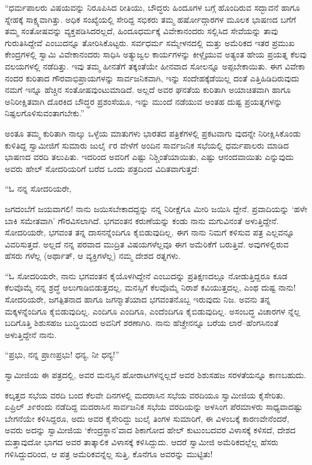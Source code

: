 “ಧರ್ಮಪಾಲರು ವಿಷಯವನ್ನು ನಿರೂಪಿಸಿದ ರೀತಿಯು, ಬೌದ್ಧರು ಹಿಂದೂಗಳ ಬಗ್ಗೆ ಹೊಂದಿರುವ ಸದ್ಭಾವನೆ ಹಾಗೂ ಸ್ನೇಹಕ್ಕೆ ಸಾಕ್ಷ್ಯವಾಗಿತ್ತು. ಅಧಿಕ ಸಂಖ್ಯೆಯಲ್ಲಿ ಸೇರಿದ್ದ ಸಭಿಕರು ತಮ್ಮ ಹರ್ಷೋದ್ಗಾರಗಳ ಮೂಲಕ ಭಾಷಣದ ಬಗೆಗೆ ತಮ್ಮ ಸಂತೋಷವನ್ನು ವ್ಯಕ್ತಪಡಿಸಿದರಲ್ಲದೆ, ಹಿಂದೂಧರ್ಮಕ್ಕೆ ವಿವೇಕಾನಂದರು ಸಲ್ಲಿಸಿದ ಸೇವೆಯನ್ನು ತಾವು ಗುರುತಿಸಿದ್ದೇವೆ ಎಂಬುದನ್ನೂ ತೋರಿಸಿಕೊಟ್ಟರು. ಸರ್ವಧರ್ಮ ಸಮ್ಮೇಳನದಲ್ಲಿ ಮತ್ತು ಅಮೆರಿಕದ ಇತರ ಪ್ರಮುಖ ಕೇಂದ್ರಗಳಲ್ಲಿ ಸ್ವಾಮಿ ವಿವೇಕಾನಂದರು ಸಾಧಿಸಿ ಅತ್ಯುಜ್ವಲ ಕಾರ್ಯಗಳನ್ನು ಕೀಳ್ಗೈಯುವ ಅತ್ಯಂತ ಹೇಯ ಪ್ರಯತ್ನ ಕೆಲವು ವಲಯಗಳಲ್ಲಿ ನಡೆದಿತ್ತು. ಇವು ತಮ್ಮ ಹೀನತೆಗೆ ತಕ್ಕಂತೆಯೇ ಹೀನವಾದ ಸೋಲನ್ನೂ ಅಪ್ಪಬೇಕಾಯಿತು. ಈಗ ವಿವೇಕಾ ನಂದರ ಕುರಿತಾದ ಗೌರವಾಭಿಪ್ರಾಯಗಳನ್ನು ಸಾರ್ವಜನಿಕವಾಗಿ, ಇನ್ನು ಸಂದೇಹಕ್ಕೆಡೆಯಿಲ್ಲ ದಂತೆ ಎತ್ತಿಹಿಡಿದಿರುವುದು ನಮಗೆ ಇನ್ನೂ ಹೆಚ್ಚಿನ ಸಂತೋಷವುಂಟುಮಾಡಿದೆ. ಅಲ್ಲದೆ ಅವರ ಘನತೆಯ ಕುರಿತಾಗಿ ಅಯಾಚಿತವಾಗಿ ಹಾಗೂ ಅನಿರೀಕ್ಷಿತವಾಗಿ ದೊರಕಿದ ಬೌದ್ಧರ ಪ್ರಶಂಸೆಯೂ, ಇನ್ನು ಮುಂದೆ ನಡೆಯುವ ಅಂತಹ ದುಷ್ಟ ಪ್ರಯತ್ನಗಳನ್ನು ನಿಷ್ಫಲಗೊಳಿಸುವಂತಾಗಬೇಕು.”

ಅಂತೂ ತಮ್ಮ ಕುರಿತಾಗಿ ನಾಲ್ಕು ಒಳ್ಳೆಯ ಮಾತುಗಳು ಭಾರತದ ಪತ್ರಿಕೆಗಳಲ್ಲಿ ಪ್ರಕಟವಾಗು ವುದನ್ನೇ ನಿರೀಕ್ಷಿಸಿಕೊಂಡು ಕುಳಿತಿದ್ದ ಸ್ವಾಮೀಜಿಗೆ ಸುಮಾರು ಜುಲೈ ೯ರ ವೇಳೆಗೆ ಅಂದಿನ ಸಾರ್ವಜನಿಕ ಸಭೆಯಲ್ಲಿ ಧರ್ಮಪಾಲರು ಮಾಡಿದ ಭಾಷಣದ ವರದಿ ತಲುಪಿತು. ಇದರಿಂದ ಅವರಿಗೆ ಎಷ್ಟು ನಿಶ್ಚಿಂತೆಯಾಯಿತು, ಎಷ್ಟು ಆನಂದವಾಯಿತು ಎನ್ನುವುದು ಅವರು ಹೇಲ್ ಸೋದರಿಯರಿಗೆ ಬರೆದ ಒಂದು ಪತ್ರದಿಂದ ವಿದಿತವಾಗುತ್ತದೆ:

“ಓ ನನ್ನ ಸೋದರಿಯರೇ,

ಜಗದಂಬೆಗೆ ಜಯವಾಗಲಿ! ನಾನು ಜಯಿಸಬೇಕಾದದ್ದನ್ನು ನನ್ನ ನಿರೀಕ್ಷೆಗೂ ಮೀರಿ ಜಯಿಸಿ ದ್ದೇನೆ. ಪ್ರವಾದಿಯನ್ನು ‘ಹಳೇ ಬಾಕಿ ಸಮೇತವಾಗಿ’ ಗೌರವಿಸಲಾಗಿದೆ. ಭಗವಂತನ ಕರುಣೆಯನ್ನು ಕಂಡು ನಾನು ಮಗುವಿನಂತೆ ಅಳುತ್ತಿದ್ದೇನೆ. ಸೋದರಿಯರೇ, ಭಗವಂತ ತನ್ನ ದಾಸನನ್ನೆಂದಿಗೂ ಕೈಬಿಡುವುದಿಲ್ಲ. ಈಗ ನಾನು ನಿಮಗೆ ಕಳಿಸುವ ಪತ್ರ ಎಲ್ಲವನ್ನೂ ವಿವರಿಸುತ್ತದೆ. ಅಲ್ಲದೆ ನನ್ನ ಪರವಾದ ಮುದ್ರಿತ ವಿಷಯಗಳೆಲ್ಲವೂ ಈಗ ಅಮೆರಿಕೆಗೆ ಬರುತ್ತಿವೆ. ಅವುಗಳಲ್ಲಿರುವ ಹೆಸರು ಗಳೆಲ್ಲ (ಅರ್ಥಾತ್, ಆ ವ್ಯಕ್ತಿಗಳೆಲ್ಲ) ನಮ್ಮ ದೇಶದ ರತ್ನಗಳು.

“ಓ ಸೋದರಿಯರೇ, ನಾನು ಭಗವಂತನ ಕೈಯೊಳಗಿದ್ದೇನೆ ಎಂಬುದನ್ನು ಪ್ರತಿಕ್ಷಣದಲ್ಲೂ ನೋಡುತ್ತಿದ್ದರೂ ಕೂಡ ಕೆಲವೊಮ್ಮೆ ನನ್ನ ಶ್ರದ್ಧೆ ಅಲುಗಾಡಿಬಿಡುತ್ತದಲ್ಲ, ಮನಸ್ಸಿಗೆ ಕೆಲವೊಮ್ಮೆ ನಿರಾಶೆ ಕವಿಯುತ್ತದಲ್ಲ, ಎಂಥ ದುಷ್ಟ ನಾನು! ಸೋದರಿಯರೇ, ಜಗತ್ಪಿತನಾದ ಹಾಗೂ ಜಗನ್ಮಾತೆಯಾದ ಭಗವಂತನೊಬ್ಬ ಇರುವುದು ನಿಜ. ಅವನು ತನ್ನ ಮಕ್ಕಳನ್ನೆಂದಿಗೂ ಕೈಬಿಡುವುದಿಲ್ಲ. ಎಂದಿಗೂ ಎಂದಿಗೂ, ಎಂದೆಂದಿಗೂ ಕೈಬಿಡುವುದಿಲ್ಲ. ಅಸಂಬದ್ಧ ವಿಚಾರಗಳ ನ್ನೆಲ್ಲ ಬದಿಗೊತ್ತಿ ಶಿಶುಸಹಜ ಬುದ್ಧಿಯಿಂದ ಅವನಿಗೆ ಶರಣಾಗಿರಿ. ನಾನು ಹೆಚ್ಚೇನನ್ನೂ ಬರೆಯ ಲಾರೆ–ಹೆಂಗಸಿನಂತೆ ಅಳುತ್ತಿದ್ದೇನೆ ನಾನು.

“ಪ್ರಭು, ನನ್ನ ಪ್ರಾಣಪ್ರಭು! ಧನ್ಯ, ನೀ ಧನ್ಯ!”

ಸ್ವಾಮೀಜಿಯ ಈ ಪತ್ರದಲ್ಲಿ, ಅವರ ಮನಸ್ಸಿನ ಹೋರಾಟಗಳನ್ನಲ್ಲದೆ ಅವರ ಶಿಶುಸಹಜ ಸರಳತೆಯನ್ನೂ ಕಾಣಬಹುದು.

ಕಲ್ಕತ್ತದ ಸಭೆಯ ವರದಿ ಬಂದ ಕೆಲವೇ ದಿನಗಳಲ್ಲಿ ಮದರಾಸಿನ ಸಭೆಯ ವರದಿಯೂ ಸ್ವಾಮೀಜಿಯ ಕೈಸೇರಿತು. ಏಪ್ರಿಲ್ ೨೯ರಂದು ನಡೆದಿದ್ದ ಮದರಾಸಿನ ಸಾರ್ವಜನಿಕ ಸಭೆಯ ವರದಿಯನ್ನು ಅಳಸಿಂಗ ಪೆರಮಾಳರು ಸಾಧ್ಯವಾದಷ್ಟು ಬೇಗನೆಯೇ ಕಳಿಸಿದ್ದರೂ, ಅದು ಅವರ ಕೈಸೇರಿದ್ದು ಜುಲೈ ತಿಂಗಳ ಸುಮಾರಿಗೆ, ಈ ವಿಳಂಬಕ್ಕೆ ಕಾರಣವೇನೆಂದರೆ, ಅವರು ಅದನ್ನು ಸ್ವಾಮೀಜಿಯ ‘ಕೇಂದ್ರಸ್ಥಾನ’ವಾದ ಶಿಕಾಗೋದ ಹೇಲ್ ಕುಟುಂಬದವರ ವಿಳಾಸಕ್ಕೆ ಕಳಿಸದೆ, ದೇಶದ ಮತ್ತಾವುದೋ ಭಾಗದ ಅವರ ತಾತ್ಕಾಲಿಕ ವಿಳಾಸಕ್ಕೆ ಕಳಿಸಿದ್ದುದು. ಆದರೆ ಸ್ವಾಮೀಜಿ ಅಮೆರಿಕದಲ್ಲೆಲ್ಲ ಹೆಸರು ಗಳಿಸಿದ್ದುದರಿಂದ, ಆ ಪತ್ರ ಅಮೆರಿಕವನ್ನೆಲ್ಲ ಸುತ್ತಿ, ಕೊನೆಗೂ ಅವರನ್ನು ಮುಟ್ಟಿತು!

